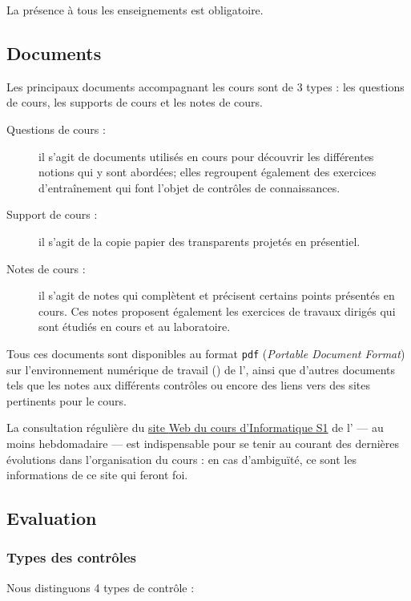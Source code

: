 \documentclass[11pt,a4paper,colorlinks,breaklinks]{article}
\begin{document}
La présence à tous les enseignements est obligatoire.

\subsection{Documents}
Les principaux documents accompagnant les cours sont de 3 types : 
les questions de cours, les supports de cours et les notes de cours.
\begin{description}
\item[Questions de cours :] il s'agit de documents utilisés en cours pour découvrir
	les différentes notions qui y sont abordées; elles regroupent également
	des exercices d'entraînement qui font l'objet de contrôles de connaissances.
\item[Support de cours :] il s'agit de la copie papier des transparents projetés
	en présentiel. 
\item[Notes de cours :] il s'agit de notes qui complètent et
	précisent certains points présentés en cours. Ces notes proposent
	également les exercices de travaux dirigés qui sont étudiés
	en cours et au laboratoire. 
\end{description}

Tous ces documents sont disponibles au format {\tt pdf} 
({\em Portable Document Format}) sur l'environ\-nement numérique de travail (\ent) de
l'\enib, ainsi que d'autres documents tels que
les notes aux différents contrôles ou encore des liens vers 
des sites pertinents pour le cours. 

La consultation régulière du \href{https://moodle.enib.fr/course/view.php?id=24}{site {\sc Web} du cours d'Informatique S1} 
de l'\enib{} --- au moins hebdomadaire --- est indispensable pour
se tenir au courant des dernières évolutions dans l'organisation du cours : en cas d'ambiguïté,
ce sont les informations de ce site qui feront foi.


\subsection{Evaluation}

\subsubsection{Types des contrôles}
Nous distinguons 4 types de contrôle :
\end{document}
